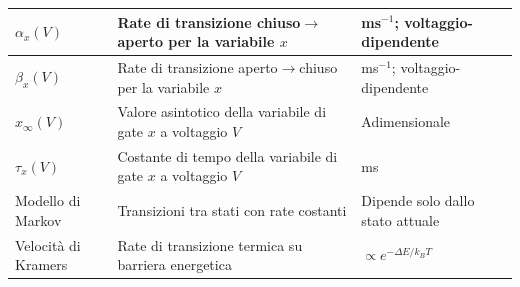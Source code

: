 \begin{table}[htbp]
\begin{tabularx}{\textwidth}{|>{\raggedright\arraybackslash}p{3cm}|>{\raggedright\arraybackslash}X|>{\raggedright\arraybackslash}X|}
    \hline
    $\alpha_x(V)$ & Rate di transizione chiuso$\rightarrow$aperto per la variabile $x$ & ms$^{-1}$; voltaggio-dipendente \\
    \hline
    $\beta_x(V)$ & Rate di transizione aperto$\rightarrow$chiuso per la variabile $x$ & ms$^{-1}$; voltaggio-dipendente \\
    \hline
    $x_\infty(V)$ & Valore asintotico della variabile di gate $x$ a voltaggio $V$ & Adimensionale \\
    \hline
    $\tau_x(V)$ & Costante di tempo della variabile di gate $x$ a voltaggio $V$ & ms \\
    \hline
    Modello di Markov & Transizioni tra stati con rate costanti & Dipende solo dallo stato attuale \\
    \hline
    Velocità di Kramers & Rate di transizione termica su barriera energetica & $\propto e^{-\Delta E/k_BT}$ \\
    \hline
   
    \end{tabularx}
\end{table}
